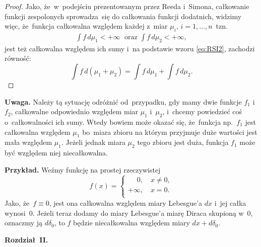 \documentclass[a4paper,11pt]{article}
\newcommand{\spaceTwo}{1em}
\newcommand{\spaceThree}{0.5em}
\newcommand{\ld}{\ldots}
\newcommand{\tr}{\textrm}
\newcommand{\del}{\delta}
\newcommand{\Int}{\int\limits}
\newcommand{\IntCaD}[2] { \Int #1 \, d#2 } %
\newcommand{\tb}{\textbf}
\newcommand{\noi}{\noindent}
\begin{document}
\begin{proof}
  Jako, że~w~podejściu prezentowanym przez Reeda i~Simona, całkowanie
  funkcji zespolonych sprowadza~się do całkowania funkcji dodatnich,
  widzimy więc, że~funkcja całkowalna względem każdej z~miar
  $\mu_{ i }$, $i = 1, \ld, n$~tzn.
  \begin{align*}
    \IntCaD{ f }{ \mu_{ 1 } } < +\infty \;\tr{  oraz  } \IntCaD{ f }{ \mu_{ 2 } }
    < +\infty,
  \end{align*}
  jest też całkowalna względem ich sumy i~na podstawie wzoru
  \eqref{eq:RSI2}, zachodzi równość:
  \begin{equation}
    \label{eq:RSI3}
    \IntCaD{ f }{ ( \mu_{ 1 } + \mu_{ 2 } ) } = \IntCaD{ f }{ \mu_{ 1 } }
    + \IntCaD{ f }{ \mu_{ 2 } }.
  \end{equation}

\end{proof}


\tb{Uwaga.} Należy tą sytuację odróżnić od~przypadku, gdy mamy dwie
funkcje $f_{ 1 }$ i~$f_{ 2 }$, całkowalne odpowiednio względem miar
$\mu_{ 1 }$ i~$\mu_{ 2 }$, i~chcemy powiedzieć coś o~całkowalności ich
sumy. Wtedy bowiem może okazać się, że~funkcja np.~$f_{ 1 }$ jest
całkowalna względem $\mu_{ 1 }$ bo~miara zbioru na którym przyjmuje
duże wartości jest mała względem $\mu_{ 1 }$. Jeżeli jednak miara
$\mu_{ 2 }$ tego zbioru jest duża, funkcja $f_{ 1 }$ może być względem
niej niecałkowalna.

\tb{Przykład.} Weźmy funkcję na prostej rzeczywistej
\begin{equation*}
  f( x ) =
  \begin{cases}
    \quad \;0, \quad x \neq 0, \\
    +\infty, \quad x = 0. \\
  \end{cases}
\end{equation*}
Jako, że~$f \equiv 0$, jest ona całkowalna względem miary Lebesgue'a
$dx$ i~jej całka wynosi~0. Jeżeli teraz dodamy do miary Lebesgue'a
miarę Diraca skupioną w~0, oznaczmy ją $d\del_{ 0 }$, to $f$ będzie
niecałkowalna względem miary $dx + d\del_{ 0 }$.

\vspace{\spaceTwo}



\noi \tb{Rozdział~II.}

\vspace{\spaceThree}
\end{document}
